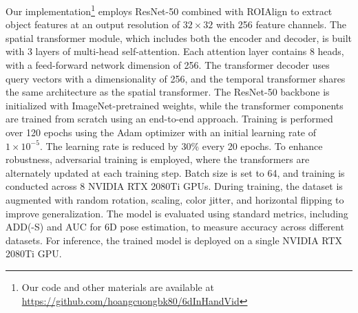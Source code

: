Our implementation\footnote{Our code and other materials are available at \url{https://github.com/hoangcuongbk80/6dInHandVid}} employs ResNet-50 \cite{he2016deep} combined with ROIAlign \cite{he2017mask} to extract object features at an output resolution of $32 \times 32$ with 256 feature channels. The spatial transformer module, which includes both the encoder and decoder, is built with 3 layers of multi-head self-attention. Each attention layer contains 8 heads, with a feed-forward network dimension of 256. The transformer decoder uses query vectors with a dimensionality of 256, and the temporal transformer shares the same architecture as the spatial transformer. The ResNet-50 backbone is initialized with ImageNet-pretrained weights, while the transformer components are trained from scratch using an end-to-end approach. Training is performed over 120 epochs using the Adam optimizer with an initial learning rate of $1 \times 10^{-5}$. The learning rate is reduced by 30\% every 20 epochs. To enhance robustness, adversarial training is employed, where the transformers are alternately updated at each training step. Batch size is set to 64, and training is conducted across 8 NVIDIA RTX 2080Ti GPUs. During training, the dataset is augmented with random rotation, scaling, color jitter, and horizontal flipping to improve generalization. The model is evaluated using standard metrics, including ADD(-S) and AUC for 6D pose estimation, to measure accuracy across different datasets. For inference, the trained model is deployed on a single NVIDIA RTX 2080Ti GPU.

